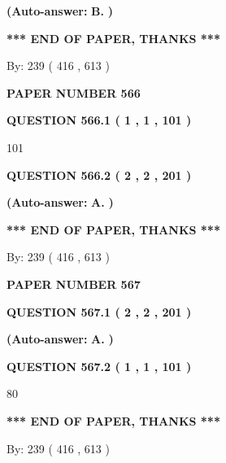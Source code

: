\documentclass[12pt]{article}
\begin{document}
 
{\textbf{(Auto-answer:}}
{\textbf{\large{
B.}}}
{\textbf{)}}
 
 
   
   
   
   
\vspace{1.0in} 
{\textbf{\large{ *** END OF PAPER, THANKS *** }}} 
   
   
\hspace{1.0in} By: 
 239 ( 416 ,  613 )
   
   
   
   
\newpage 
\setcounter{page}{ 
   566001 } 
   
   
 {\textbf{ \Large{ PAPER NUMBER  566  }}}
   
   
   
   
  
  
{\textbf{\large{QUESTION
566.1 
 ( 1 , 1 , 101 )
}}}

101
  
  
{\textbf{\large{QUESTION
566.2 
 ( 2 , 2 , 201 )
}}}
 
 
{\textbf{(Auto-answer:}}
{\textbf{\large{
A.}}}
{\textbf{)}}
 
 
   
   
   
   
\vspace{1.0in} 
{\textbf{\large{ *** END OF PAPER, THANKS *** }}} 
   
   
\hspace{1.0in} By: 
 239 ( 416 ,  613 )
   
   
   
   
\newpage 
\setcounter{page}{ 
   567001 } 
   
   
 {\textbf{ \Large{ PAPER NUMBER  567  }}}
   
   
   
   
  
  
{\textbf{\large{QUESTION
567.1 
 ( 2 , 2 , 201 )
}}}
 
 
{\textbf{(Auto-answer:}}
{\textbf{\large{
A.}}}
{\textbf{)}}
 
 
  
  
{\textbf{\large{QUESTION
567.2 
 ( 1 , 1 , 101 )
}}}

80
   
   
   
   
\vspace{1.0in} 
{\textbf{\large{ *** END OF PAPER, THANKS *** }}} 
   
   
\hspace{1.0in} By: 
 239 ( 416 ,  613 )
   
   
   
\end{document}
